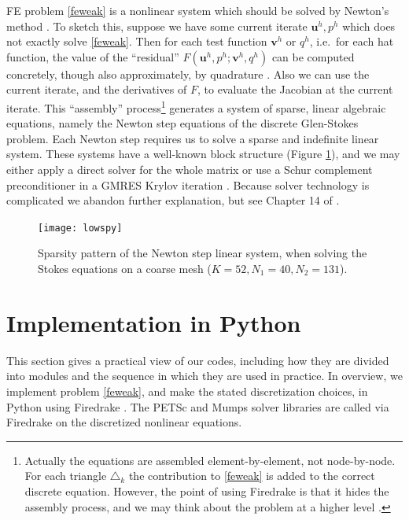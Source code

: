 \documentclass[letterpaper,final,12pt,reqno]{amsart}
\newcommand{\bu}{\mathbf{u}}
\newcommand{\bv}{\mathbf{v}}
\begin{document}
FE problem \eqref{feweak} is a nonlinear system which should be solved by Newton's method \cite{Bueler2021,Kelley2003}.  To sketch this, suppose we have some current iterate $\bu^h,p^h$ which does not exactly solve \eqref{feweak}.  Then for each test function $\bv^h$ or $q^h$, i.e.~for each hat function, the value of the ``residual'' $F(\bu^h,p^h;\bv^h,q^h)$ can be computed concretely, though also approximately, by quadrature \cite{Bueler2021,Elmanetal2014}.  Also we can use the current iterate, and the derivatives of $F$, to evaluate the Jacobian at the current iterate.  This ``assembly'' process\footnote{Actually the equations are assembled element-by-element, not node-by-node.  For each triangle $\triangle_k$ the contribution to \eqref{feweak} is added to the correct discrete equation.  However, the point of using Firedrake is that it hides the assembly process, and we may think about the problem at a higher level \cite{Rathgeberetal2016}.} generates a system of sparse, linear algebraic equations, namely the Newton step equations of the discrete Glen-Stokes problem.  Each Newton step requires us to solve a sparse and indefinite linear system.  These systems have a well-known block structure (Figure \ref{fig:lowspy}), and we may either apply a direct solver for the whole matrix or use a Schur complement preconditioner in a GMRES Krylov iteration \cite{Elmanetal2014,GolubVanLoan2013}.  Because solver technology is complicated we abandon further explanation, but see Chapter 14 of \cite{Bueler2021}.

\begin{figure}[h]
\texttt{[image: lowspy]}
\caption{Sparsity pattern of the Newton step linear system, when solving the Stokes equations on a coarse mesh ($K=52,N_1=40,N_2=131$).}
\label{fig:lowspy}
\end{figure}


\section{Implementation in Python} \label{sec:implementation}

This section gives a practical view of our codes, including how they are divided into modules and the sequence in which they are used in practice.  In overview, we implement problem \eqref{feweak}, and make the stated discretization choices, in Python using Firedrake \cite{Rathgeberetal2016}.  The PETSc \cite{Balayetal2018} and Mumps \cite{Amestoy2001} solver libraries are called via Firedrake on the discretized nonlinear equations.
\end{document}
